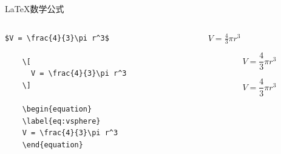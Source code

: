         
    \begin{frame}[fragile]{\LaTeX 数学公式}
    
    \begin{columns}
    \begin{column}{.5\textwidth}
    \lstset{language=[LaTeX]TeX}
    \begin{lstlisting}[basicstyle=\ttfamily\small]
    $V = \frac{4}{3}\pi r^3$
    
    \[
      V = \frac{4}{3}\pi r^3
    \]
    
    \begin{equation}
    \label{eq:vsphere}
    V = \frac{4}{3}\pi r^3
    \end{equation}
    \end{lstlisting}
    \end{column}
    
    \begin{column}{.5\textwidth}
    $V = \frac{4}{3}\pi r^3$
    
    \[
      V = \frac{4}{3}\pi r^3
    \]
    
    \begin{equation}
    \label{eq:vsphere}
    V = \frac{4}{3}\pi r^3
    \end{equation}
    \end{column}
    \end{columns}
    
    \end{frame}

    
